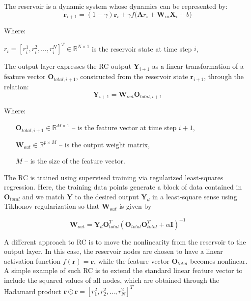 \documentclass[11pt, oneside]{article}
\begin{document}
The reservoir is a
dynamic system whose dynamics can be represented by:
\begin{equation}
    \mathbf{r}_{i+1} = (1 - \gamma) \mathbf{r}_i + \gamma f \big(\mathbf{A} r_i + \mathbf{W}_{in} \mathbf{X}_i + b \big)
\end{equation}

Where: 

\( r_i = [r_i^1, r_i^2, \ldots, r_i^N]^T \in \mathbb{R}^{N \times 1} \) is the reservoir state at time step \(i\),

The output layer expresses the RC output \(\mathbf{Y}_{i+1}\) as a linear
transformation of a feature vector \(\mathbf{O}_{total,i+1}\), constructed from the
reservoir state \(\mathbf{r}_{i+1}\), through the relation:
\begin{equation}
    \mathbf{Y}_{i+1} = \mathbf{W}_{out} \mathbf{O}_{total,i+1}
\end{equation}

Where:
\begin{itemize}[noitemsep, leftmargin=4cm, label={}]
    \item [\(\mathbf{O}_{total,i+1} \in \mathbb{R}^{M \times 1}\)] -- is the feature vector at time step \(i+1\),
    \item [\(\mathbf{W}_{out} \in \mathbb{R}^{p \times M}\)] -- is the output weight matrix,
    \item [\(M\)] -- is the size of the feature vector.
\end{itemize}


The RC is trained using supervised training via regularized least-squares regression. Here, the training data points generate a block of data contained in \(\mathbf{O}_{total}\) and we match \(\mathbf{Y}\) to the desired output \(\mathbf{Y}_d\) in a least-square sense using Tikhonov regularization so that \(\mathbf{W}_{out}\) is given by

\begin{equation}
    \mathbf{W}_{out} = \mathbf{Y}_d \mathbf{O}_{total}^T (\mathbf{O}_{total} \mathbf{O}_{total}^T + \alpha \mathbf{I})^{-1}
\end{equation}

A different approach to RC is to move the nonlinearity from the reservoir to the output layer. In this case, the reservoir nodes are chosen to have a linear activation function \(f(\mathbf{r}) = \mathbf{r}\), while the feature vector \(\mathbf{O}_{total}\) becomes nonlinear. A simple example of such RC is to extend the standard linear feature vector to include the squared values of all nodes, which are obtained through the Hadamard product \( \mathbf{r} \odot \mathbf{r} =  [r_1^2, r_2^2, \ldots, r_N^2]^T \)
\end{document}
